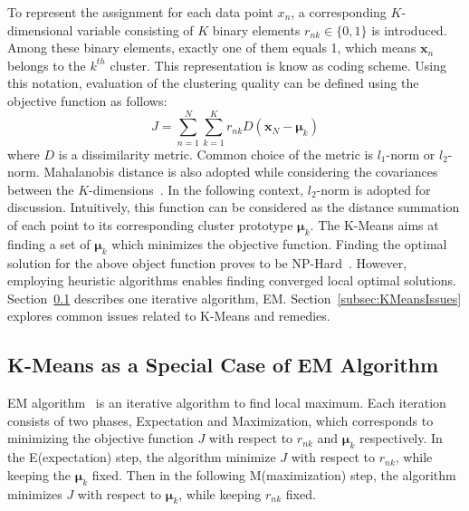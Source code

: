 To represent the assignment for each data point $x_n$, a corresponding  $K$-dimensional variable consisting of $K$ binary elements $r_{nk} \in \{0, 1\}$ is introduced. Among these binary elements, exactly one of them equals 1, which means $\mathbf{x}_{n}$ belongs to the $k^{th}$ cluster. This representation is know as  coding scheme. Using this notation, evaluation of the clustering quality can be defined using the objective function as follows:
\begin{equation}	
	\label{eq:kmeansobj}
	J = \sum_{n=1}^{N}\sum_{k=1}^{K}r_{nk}D(\mathbf{x}_{N} - \boldsymbol{\mu}_{k})
\end{equation}
where $D$ is a dissimilarity metric. Common choice of the metric is $\mathit{l}_1$-norm or $\mathit{l}_2$-norm. Mahalanobis distance is also adopted while considering the covariances between the $K$-dimensions~\cite{davis1986statistics}. In the following context, $\mathit{l}_2$-norm is adopted for discussion. 
 Intuitively, this function can be considered as the distance summation of each point to its corresponding cluster prototype $\boldsymbol{\mu}_k$. The K-Means aims at finding a set of $\boldsymbol{\mu}_k$ which minimizes the objective function. Finding the optimal solution for the above object function proves to be NP-Hard~\cite{aloise2009np}. However, employing heuristic algorithms enables finding converged local optimal solutions. Section~\ref{subsec:EM} describes one iterative algorithm, EM. Section~\ref{subsec:KMeansIssues} explores common issues related to K-Means and remedies.
\subsection{K-Means as a Special Case of EM Algorithm}
\label{subsec:EM}

EM algorithm~\cite{dempster1977maximum} is an iterative algorithm to find local maximum. Each iteration consists of two phases, Expectation and Maximization, which corresponds to minimizing the objective function $J$ with respect to $r_{nk}$ and $\boldsymbol{\mu}_{k}$ respectively. In the E(expectation) step, the algorithm minimize $J$ with respect to $r_{nk}$, while keeping the $\boldsymbol{\mu}_{k}$ fixed. Then in the following M(maximization) step, the algorithm minimizes $J$ with respect to $\boldsymbol{\mu}_{k}$, while keeping $r_{nk}$ fixed. 

